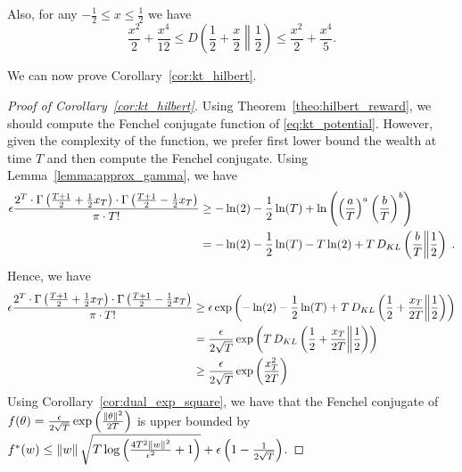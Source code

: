 Also, for any $-\frac{1}{2} \leq x\leq \frac{1}{2}$ we have
\[
\frac{x^2}{2} +\frac{x^4}{12}\leq D\left(\frac{1}{2}+\frac{x}{2}\middle\|\frac{1}{2}\right) \leq \frac{x^2}{2} + \frac{x^4}{5}.
\]

We can now prove Corollary~\ref{cor:kt_hilbert}.
\begin{proof}[Proof of Corollary~\ref{cor:kt_hilbert}]
Using Theorem~\ref{theo:hilbert_reward}, we should compute the Fenchel conjugate function of \eqref{eq:kt_potential}.
However, given the complexity of the function, we prefer first lower bound the wealth at time $T$ and then compute the Fenchel conjugate.
Using Lemma~\ref{lemma:approx_gamma}, we have
\begin{align*}
\epsilon  \frac{2^T \cdot \Gamma \left(\frac{T+1}{2} + \frac{1}{2} x_{T} \right) \cdot \Gamma \left(\frac{T+1}{2} - \frac{1}{2} x_{T} \right)}{\pi \cdot T!} 
&\geq -\ln(2) -\frac{1}{2} \ln(T) +\ln \left(\left( \frac{a}{T} \right)^a \left( \frac{b}{T} \right)^b\right) \\
&= -\ln(2) -\frac{1}{2} \ln(T) -T \ln (2) + T \, D_{KL}\left(\frac{b}{T}\middle\|\frac{1}{2}\right) \; .
\end{align*}
Hence, we have
\begin{align*}
\epsilon  \frac{2^T \cdot \Gamma \left(\frac{T+1}{2} + \frac{1}{2} x_{T} \right) \cdot \Gamma \left(\frac{T+1}{2} - \frac{1}{2} x_{T} \right)}{\pi \cdot T!} 
&\geq \epsilon \exp\left(-\ln(2) -\frac{1}{2} \ln(T) + T \, D_{KL}\left(\frac{1}{2}+\frac{x_T}{2T}\middle\|\frac{1}{2}\right)\right) \\
&= \frac{\epsilon}{2 \sqrt{T}} \exp\left(T \, D_{KL}\left(\frac{1}{2}+\frac{x_T}{2T}\middle\|\frac{1}{2}\right)\right) \\
&\geq \frac{\epsilon}{2 \sqrt{T}} \exp\left(\frac{x_T^2}{2T}\right)
\end{align*}
Using Corollary~\ref{cor:dual_exp_square}, we have that the Fenchel conjugate of $f(\theta)=\frac{\epsilon}{2\sqrt{T}} \exp\left(\frac{\left\|{\theta}\right\|^2}{2 T}\right)$ is upper bounded by $f^*(w) \leq \left\|{w}\right\| \sqrt{T \log \left(\frac{4 T^2 \left\|{w}\right\|^2}{\epsilon^2} +1 \right)}+\epsilon\left(1-\frac{1}{2\sqrt{T}}\right)$.
\end{proof}


